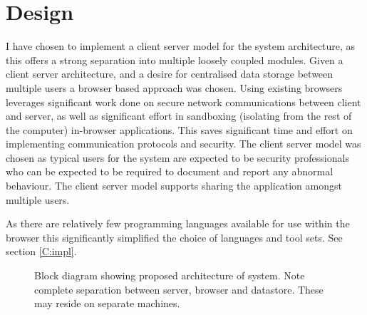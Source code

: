 \chapter{Design}\label{design}

I have chosen to implement a client server model for the system architecture, as this offers a strong separation into multiple loosely coupled modules. Given a client server architecture, and a desire for centralised data storage between multiple users a browser based approach was chosen. Using existing browsers leverages significant work done on secure network communications between client and server, as well as significant effort in sandboxing (isolating from the rest of the computer) in-browser applications. This saves significant time and effort on implementing communication protocols and security.  The client server model was chosen as typical users for the system are expected to be security professionals who can be expected to be required to document and report any abnormal behaviour. The client server model supports sharing the application amongst multiple users. 

As there are relatively few programming languages available for use within the browser this significantly simplified the choice of languages and tool sets. See section \ref{C:impl}.

\begin{figure}[tbh]
\caption{\protect\label{spiral_plan}Block diagram showing proposed architecture of system. Note complete separation between server, browser and datastore. These may reside on separate machines.}
\end{figure}

